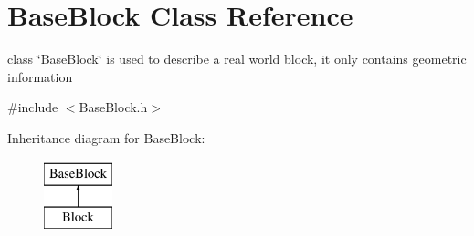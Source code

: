 \hypertarget{classBaseBlock}{\section{\-Base\-Block \-Class \-Reference}
\label{classBaseBlock}
}


class \char`\"{}\-Base\-Block\char`\"{} is used to describe a real world block, it only contains geometric information  




{\ttfamily \#include $<$\-Base\-Block.\-h$>$}

\-Inheritance diagram for \-Base\-Block\-:\begin{figure}[H]
\begin{center}
\leavevmode
\includegraphics[height=2.000000cm]{classBaseBlock}
\end{center}
\end{figure}
